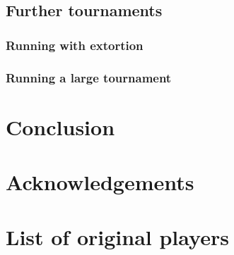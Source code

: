 \documentclass{article}
\begin{document}
\subsection{Further tournaments}


\subsubsection{Running with extortion}\label{sec:run_with_stewart_plotkin}


\subsubsection{Running a large tournament}\label{sec:run_with_everyone}


\section{Conclusion}\label{sec:conclusion}

\section*{Acknowledgements}





\appendix

\section{List of original players}\label{app:list_of_original_players}


\begin{multicols}{2}
    \begin{enumerate}
            
    \end{enumerate}
\end{multicols}
\end{document}
